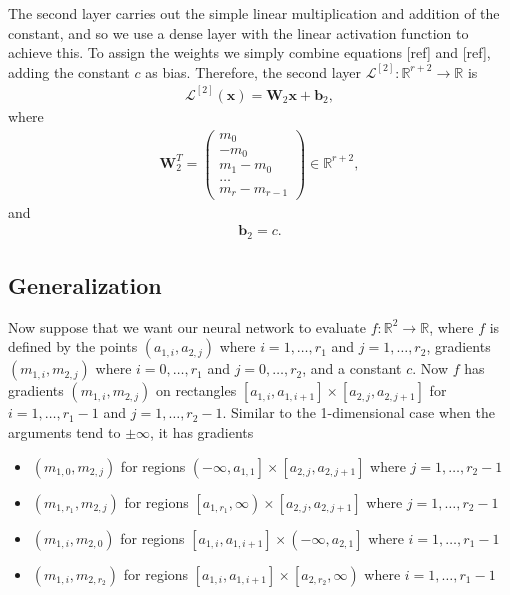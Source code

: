 \documentclass{somasmsc}
\begin{document}
The second layer carries out the simple linear multiplication and addition of the constant, and so we use a dense layer with the linear activation function to achieve this. To assign the weights we simply combine equations [ref] and [ref], adding the constant $c$ as bias. Therefore, the second layer $\mathcal{L}^{\left[2\right]}: \mathbb{R}^{r+2} \rightarrow \mathbb{R}$ is
\begin{align*}
\mathcal{L}^{\left[2\right]}\left(\pmb{x}\right) = \mathbf{W}_2 \pmb{x} + \pmb{b}_2,
\end{align*}
where
\begin{align*}
\mathbf{W}_2^T =
\begin{pmatrix}
    m_0 \\
    -m_0 \\
    m_1 - m_0 \\
    \dots \\
    m_r - m_{r-1}
\end{pmatrix} \in \mathbb{R}^{r+2},
\end{align*}
and
\begin{align*}
\pmb{b}_2 = c.
\end{align*}

\subsection{Generalization}\label{piece:nd}

Now suppose that we want our neural network to evaluate $f:\mathbb{R}^2 \rightarrow \mathbb{R}$, where $f$ is defined by the points $\left(a_{1,i}, a_{2,j}\right)$ where $i=1, \dots, r_1$ and $j=1, \dots, r_2$, gradients $\left(m_{1,i}, m_{2,j}\right)$ where $i=0, \dots, r_1$ and $j=0, \dots, r_2$, and a constant $c$. Now $f$ has gradients $\left(m_{1,i}, m_{2,j}\right)$ on rectangles $\left[a_{1,i}, a_{1,i+1}\right] \times \left[a_{2,j}, a_{2,j+1}\right]$ for $i=1, \dots, r_1 - 1$ and $j=1, \dots, r_2 - 1$. Similar to the 1-dimensional case when the arguments tend to $\pm \infty$, it has gradients
\begin{itemize}
    \item $\left(m_{1,0}, m_{2,j}\right)$ for regions $\left(-\infty, a_{1,1}\right] \times \left[a_{2,j}, a_{2,j+1}\right]$ where $j=1, \dots, r_2 - 1$
    \item $\left(m_{1,r_1}, m_{2,j}\right)$ for regions $\left[a_{1, r_1}, \infty\right) \times \left[a_{2,j}, a_{2,j+1}\right]$ where $j=1, \dots, r_2 - 1$
    \item $\left(m_{1,i}, m_{2,0}\right)$ for regions $\left[a_{1,i}, a_{1,i+1}\right] \times \left(-\infty, a_{2,1}\right]$ where $i=1, \dots, r_1 - 1$
    \item $\left(m_{1,i}, m_{2,r_2}\right)$ for regions $\left[a_{1,i}, a_{1,i+1}\right] \times \left[a_{2,r_2}, \infty\right)$ where $i=1, \dots, r_1 - 1$
\end{itemize}
\end{document}
